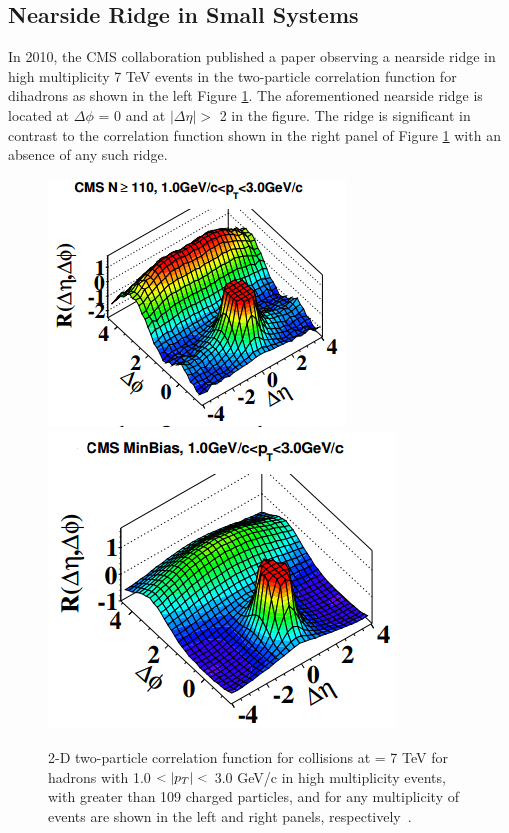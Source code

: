 \subsection{Nearside Ridge in Small Systems}
In 2010, the CMS collaboration published a paper observing a nearside ridge in high multiplicity 7 TeV \pp events in the two-particle correlation function for dihadrons as shown in the left Figure \ref{fig:pp_ridge_plot}. The aforementioned nearside ridge is located at $\Delta\phi$ = 0 and at $|\Delta\eta| > $ 2 in the figure. The ridge is significant in contrast to the \pp correlation function shown in the right panel of Figure \ref{fig:pp_ridge_plot} with an absence of any such ridge.
\begin{figure}[h!]
\begin{center}
\includegraphics[width=0.47\linewidth]{figs/pp_high_multiplicity_ridge.PNG}
\includegraphics[width=0.47\linewidth]{figs/pp_correlation_function_min_bias.png}
\caption{2-D two-particle correlation function for \pp collisions at \sqsn = 7 TeV for hadrons with 1.0 $<|\pt|<$ 3.0 GeV/c in high multiplicity events, with greater than 109 charged particles, and for any multiplicity of events are shown in the left and right panels, respectively~\cite{Khachatryan2010}.}
\label{fig:pp_ridge_plot}
\end{center}
\end{figure}

